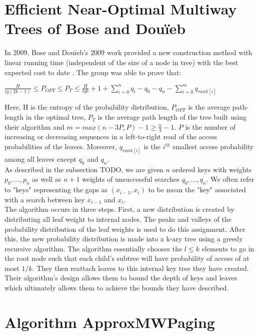 \documentclass[letterpaper,12pt,titlepage,oneside,final]{book}
\theoremstyle{plain}
\begin{document}
\section{Efficient Near-Optimal Multiway Trees of Bose and Dou\"{i}eb}
In 2009, Bose and Dou\"{i}eb's 2009 work provided a new construction method with linear running time (independent of the size of a node in tree) with the best expected cost to date \cite{bose2009efficient}. The group was able to prove that:
\begin{center}
$\frac{H}{lg(2k-1)} \leq P_{OPT} \leq P_T \leq \frac{H}{lg k} + 1 + \sum_{i=0}^n q_i - q_0 - q_n - \sum_{i=0}^m q_{rank[i]}$
\end{center}
Here, H is the entropy of the probability distribution, $P_{OPT}$ is the average path-length in the optimal tree, $P_T$ is the average path length of the tree built using their algorithm and $m=max({n-3P,P})-1 \geq \frac{n}{4} - 1$. $P$ is the number of increasing or decreasing sequences in a left-to-right read of the access probabilities of the leaves. Moreover, $q_{rank[i]}$ is the $i^{th}$ smallest access probability among all leaves except $q_0$ and $q_n$. \\
 As described in the subsection TODO, we are given $n$ ordered keys with weights $p_0, ..., p_n$ as well as $n+1$ weights of unsuccessful searches $q_0,...,q_n$. We often refer to "keys" representing the gaps as $(x_{i-1},x_i)$ to be mean the "key" associated with a search between key $x_{i-1}$ and $x_i$. \\
 
 The algorithm occurs in three steps. First, a new distribution is created by distributing all leaf weight to internal nodes. The peaks and valleys of the probability distribution of the leaf weights is used to do this assignment. After this, the new probability distribution is made into a k-ary tree using a greedy recursive algorithm. The algorithm essentially chooses the $l \leq k$ elements to go in the root node such that each child's subtree will have probability of access of at most $1/k$. They then reattach leaves to this internal key tree they have created. Their algorithm's design allows them to bound the depth of keys and leaves which ultimately allows them to achieve the bounds they have described. 

\section{Algorithm ApproxMWPaging}
\end{document}
